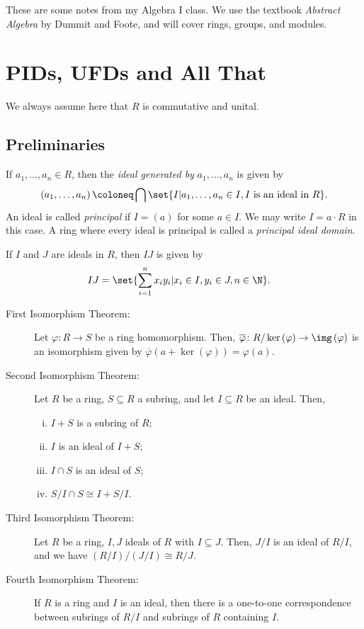 \documentclass[10pt]{mypackage}
\begin{document}
\RaggedRight
These are some notes from my Algebra I class. We use the textbook \textit{Abstract Algebra} by Dummit and Foote, and will cover rings, groups, and modules.
\tableofcontents
\section{PIDs, UFDs and All That}%
We always assume here that $R$ is commutative and unital.
\subsection{Preliminaries}%
\begin{definition}
  If $a_1,\dots,a_n\in R$, then the \textit{ideal generated by} $a_1,\dots,a_n$ is given by
  \begin{align*}
    \left( a_1,\dots,a_n \right) \coloneq \bigcap\set{I | a_1,\dots,a_n\in I,I\text{ is an ideal in }R}.
  \end{align*}
  An ideal is called \textit{principal} if $I = \left( a \right)$ for some $a\in I$. We may write $I = a\cdot R$ in this case. A ring where every ideal is principal is called a \textit{principal ideal domain}.
\end{definition}
\begin{definition}
  If $I$ and $J$ are ideals in $R$, then $IJ$ is given by
  \begin{align*}
    IJ &= \set{\sum_{i=1}^{n}x_iy_i | x_i\in I, y_i\in J,n\in \N}.
  \end{align*}
\end{definition}
\begin{theorem}\hfill
  \begin{description}
    \item[First Isomorphism Theorem:] Let $\varphi\colon R\rightarrow S$ be a ring homomorphism. Then, $ \overline{\varphi}\colon R/\ker\left( \varphi \right)\rightarrow \img\left( \varphi \right) $ is an isomorphism given by $ \overline{\varphi}\left( a + \ker\left( \varphi \right) \right) = \varphi\left( a \right) $.
    \item[Second Isomorphism Theorem:] Let $R$ be a ring, $S\subseteq R$ a subring, and let $I\subseteq R$ be an ideal. Then,
      \begin{enumerate}[(i)]
        \item $I + S$ is a subring of $R$;
        \item $I$ is an ideal of $I + S$;
        \item $I\cap S$ is an ideal of $S$;
        \item $S/I\cap S \cong I + S/I$.
      \end{enumerate}
    \item[Third Isomorphism Theorem:] Let $R$ be a ring, $I,J$ ideals of $R$ with $I\subseteq J$. Then, $J/I$ is an ideal of $R/I$, and we have $\left( R/I \right)/\left( J/I \right) \cong R/J$.
    \item[Fourth Isomorphism Theorem:] If $R$ is a ring and $I$ is an ideal, then there is a one-to-one correspondence between subrings of $R/I$ and subrings of $R$ containing $I$.
  \end{description}
\end{theorem}
\end{document}
